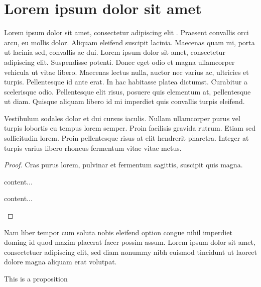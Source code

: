 \documentclass[a4paper,UKenglish,cleveref, autoref]{lipics-v2019}
\begin{document}
\section{Lorem ipsum dolor sit amet}

Lorem ipsum dolor sit amet, consectetur adipiscing elit \cite{DBLP:journals/cacm/Knuth74}. Praesent convallis orci arcu, eu mollis dolor. Aliquam eleifend suscipit lacinia. Maecenas quam mi, porta ut lacinia sed, convallis ac dui. Lorem ipsum dolor sit amet, consectetur adipiscing elit. Suspendisse potenti. Donec eget odio et magna ullamcorper vehicula ut vitae libero. Maecenas lectus nulla, auctor nec varius ac, ultricies et turpis. Pellentesque id ante erat. In hac habitasse platea dictumst. Curabitur a scelerisque odio. Pellentesque elit risus, posuere quis elementum at, pellentesque ut diam. Quisque aliquam libero id mi imperdiet quis convallis turpis eleifend. 

\begin{lemma}
\label{lemma:lorem}
Vestibulum sodales dolor et dui cursus iaculis. Nullam ullamcorper purus vel turpis lobortis eu tempus lorem semper. Proin facilisis gravida rutrum. Etiam sed sollicitudin lorem. Proin pellentesque risus at elit hendrerit pharetra. Integer at turpis varius libero rhoncus fermentum vitae vitae metus.
\end{lemma}

\begin{proof}
Cras purus lorem, pulvinar et fermentum sagittis, suscipit quis magna.

\begin{claim}
content...
\end{claim}
\begin{claimproof}
content...
\end{claimproof}

\end{proof}

\begin{corollary}
\label{lemma:curabitur}
Nam liber tempor cum soluta nobis eleifend option congue nihil imperdiet doming id quod mazim placerat facer possim assum. Lorem ipsum dolor sit amet, consectetuer adipiscing elit, sed diam nonummy nibh euismod tincidunt ut laoreet dolore magna aliquam erat volutpat.
\end{corollary}

\begin{proposition}\label{prop1}
This is a proposition
\end{proposition}
\end{document}
